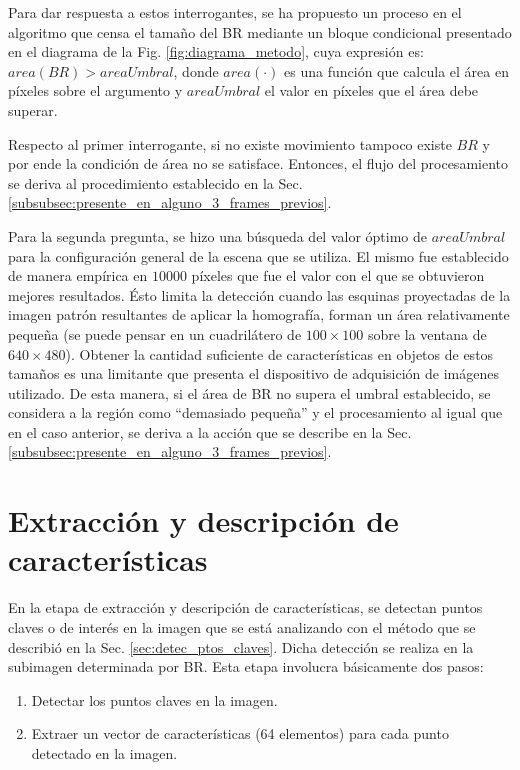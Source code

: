 Para dar respuesta a estos interrogantes, se ha propuesto un proceso en el algoritmo que censa el tamaño del BR mediante un bloque condicional presentado en el diagrama de la Fig. \ref{fig:diagrama_metodo}, cuya expresión es: $area(BR)>areaUmbral$, donde $area(\cdot)$ es una función que calcula el área en píxeles sobre el argumento y $areaUmbral$ el valor en píxeles que el área debe superar.

Respecto al primer interrogante, si no existe movimiento tampoco existe $BR$ y por ende la condición de área no se satisface. Entonces, el flujo del procesamiento se deriva al procedimiento establecido en la Sec. \ref{subsubsec:presente_en_alguno_3_frames_previos}.

Para la segunda pregunta, se hizo una búsqueda del valor óptimo de $areaUmbral$ para la configuración general de la escena que se utiliza. El mismo fue establecido de manera empírica en $10000$ píxeles que fue el valor con el que se obtuvieron mejores resultados. Ésto limita la detección cuando las esquinas proyectadas de la imagen patrón resultantes de aplicar la homografía, forman un área relativamente pequeña (se puede pensar en un cuadrilátero de $100 \times 100$ sobre la ventana de $640 \times 480$). Obtener la cantidad suficiente de características en objetos de estos tamaños es una limitante que presenta el dispositivo de adquisición de imágenes utilizado. De esta manera, si el área de BR no supera el umbral establecido, se considera a la región como ``demasiado pequeña'' y el procesamiento al igual que en el caso anterior, se deriva a la acción que se describe en la Sec. \ref{subsubsec:presente_en_alguno_3_frames_previos}.
\section{Extracción y descripción de características}
\label{sec:extract_y_descrip_caracteristicas}
En la etapa de extracción y descripción de características, se detectan puntos claves o de interés en la imagen que se está analizando con el método que se describió en la Sec. \ref{sec:detec_ptos_claves}. Dicha detección se realiza en la subimagen determinada por BR. %
Esta etapa involucra básicamente dos pasos:
\begin{enumerate}
 \item Detectar los puntos claves en la imagen.
 \item Extraer un vector de características (64 elementos) para cada punto detectado en la imagen.
\end{enumerate}
% 

